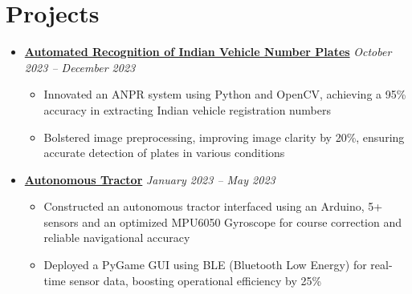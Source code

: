 \documentclass[letterpaper,11pt]{article}
\begin{document}
\section{Projects}
\begin{itemize}[leftmargin=0mm, label={}, itemsep=0pt]
  \item \href{https://github.com/rm1738/Indian_Plate_Recognition/blob/main/annotated-DIP_Final_Report_Rahul_Menon.pdf}{\textbf{Automated Recognition of Indian Vehicle Number Plates}} \hfill \textit{\small October 2023 -- December 2023} \vspace{-0.3\baselineskip} %
  \begin{itemize}[leftmargin=5mm, itemsep=0pt, topsep=0pt, parsep=0pt, label={\textbullet}]
    \item \small Innovated an ANPR system using Python and OpenCV, achieving a 95\% accuracy in extracting Indian vehicle registration numbers
    \item \small Bolstered image preprocessing, improving image clarity by 20\%, ensuring accurate detection of plates in various conditions
  \end{itemize}

  \item \href{https://github.com/rm1738/Autonomous_Tractor}{\textbf{Autonomous Tractor}} \hfill \textit{\small January 2023 -- May 2023} \vspace{-0.3\baselineskip} %
  \begin{itemize}[leftmargin=5mm, itemsep=0pt, topsep=0pt, parsep=0pt, label={\textbullet}]
    \item \small Constructed an autonomous tractor interfaced using an Arduino, 5+ sensors and an optimized MPU6050 Gyroscope for course correction and reliable navigational accuracy
    \item \small Deployed a PyGame GUI using BLE (Bluetooth Low Energy) for real-time sensor data, boosting operational efficiency by 25\%
  \end{itemize}
\end{itemize}

\vspace{-0.75\baselineskip} %

\end{document}
